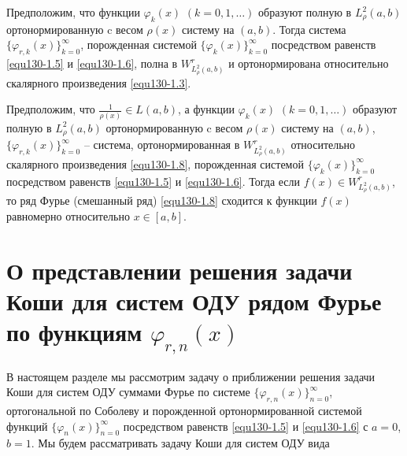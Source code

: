 \begin{theoremA}\label{equ130theoA}
 Предположим, что    функции $\varphi_k(x)$ $(k=0,1,\ldots)$ образуют полную в $L^2_\rho(a,b)$ ортонормированную   c весом   $\rho(x)$ систему на  $(a,b)$. Тогда система $\{\varphi_{r,k}(x)\}_{k=0}^\infty$, порожденная системой $\{\varphi_{k}(x)\}_{k=0}^\infty$ посредством равенств \eqref{equ130-1.5} и \eqref{equ130-1.6}, полна  в $W^r_{L^2_\rho(a,b)}$ и ортонормирована относительно скалярного произведения \eqref{equ130-1.3}.
\end{theoremA}

\begin{theoremA}\label{equ130theoB}
Предположим, что  $ \frac{1}{\rho(x)}\in L(a,b) $, а  функции $\varphi_k(x)$ $(k=0,1,\ldots)$  образуют полную в $L^2_\rho(a,b)$ ортонормированную   c весом   $\rho(x)$ систему на $(a,b)$, $\{\varphi_{r,k}(x)\}_{k=0}^\infty$ -- система, ортонормированная в $W^r_{L^2_\rho(a,b)}$ относительно скалярного произведения \eqref{equ130-1.8},  порожденная системой $\{\varphi_{k}(x)\}_{k=0}^\infty$ посредством равенств \eqref{equ130-1.5} и \eqref{equ130-1.6}.
Тогда если $f(x)\in W^r_{L^2_\rho(a,b)}$, то ряд Фурье (смешанный ряд) \eqref{equ130-1.8} сходится к функции $f(x)$ равномерно относительно $x\in[a,b]$.
\end{theoremA}
\vskip 0.2cm



\section{О представлении решения задачи Коши для систем ОДУ рядом Фурье по функциям $\varphi_{r,n}(x)$}
В настоящем разделе мы рассмотрим задачу о приближении решения задачи Коши для систем ОДУ  суммами  Фурье по системе $\{\varphi_{r,n}(x)\}_{n=0}^\infty$, ортогональной по Соболеву и порожденной ортонормированной системой функций $\{\varphi_{n}(x)\}_{n=0}^\infty$ посредством равенств \eqref{equ130-1.5} и \eqref{equ130-1.6} с $a=0$, $b=1$.
 Мы будем рассматривать задачу Коши для систем ОДУ вида

